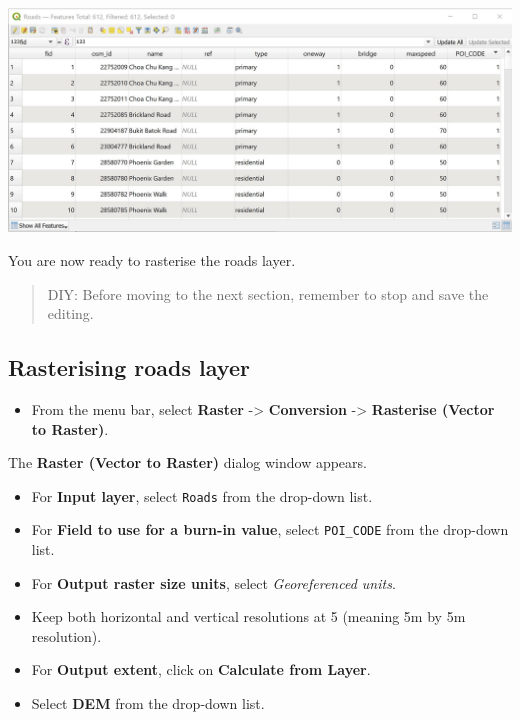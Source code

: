 \documentclass[
  letterpaper,
  DIV=11,
  numbers=noendperiod]{scrreprt}
\providecommand{\tightlist}{%
  \setlength{\itemsep}{0pt}\setlength{\parskip}{0pt}}\usepackage{longtable,booktabs,array}
\begin{document}
\includegraphics{./img07/image24.jpg}

You are now ready to rasterise the roads layer.

\begin{quote}
DIY: Before moving to the next section, remember to stop and save the
editing.
\end{quote}

\hypertarget{rasterising-roads-layer}{%
\subsection{Rasterising roads layer}\label{rasterising-roads-layer}}

\begin{itemize}
\tightlist
\item
  From the menu bar, select \textbf{Raster} -\textgreater{}
  \textbf{Conversion} -\textgreater{} \textbf{Rasterise (Vector to
  Raster)}.
\end{itemize}

The \textbf{Raster (Vector to Raster)} dialog window appears.

\begin{itemize}
\tightlist
\item
  For \textbf{Input layer}, select \texttt{Roads} from the drop-down
  list.
\item
  For \textbf{Field to use for a burn-in value}, select
  \texttt{POI\_CODE} from the drop-down list.
\item
  For \textbf{Output raster size units}, select \emph{Georeferenced
  units}.
\item
  Keep both horizontal and vertical resolutions at 5 (meaning 5m by 5m
  resolution).
\item
  For \textbf{Output extent}, click on \textbf{Calculate from Layer}.
\item
  Select \textbf{DEM} from the drop-down list.
\end{itemize}
\end{document}
